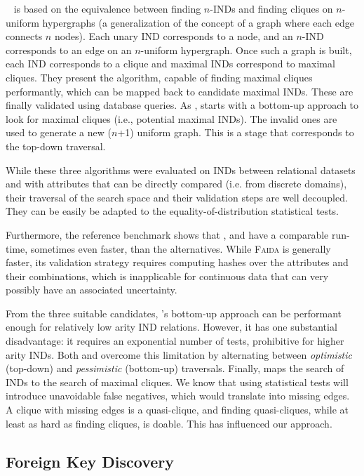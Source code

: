 \Find~\cite{koeller2003discovery} is based on the equivalence
between finding $n$-INDs and finding cliques on $n$-uniform hypergraphs (a generalization
of the concept of a graph where each edge connects $n$ nodes). Each unary IND corresponds
to a node, and an $n$-IND corresponds to an edge on an $n$-uniform hypergraph.
Once such a graph is built, each IND corresponds to a clique and maximal INDs
correspond to maximal cliques. They present the \Hyperclique algorithm,
capable of finding maximal cliques performantly, which can be mapped back to candidate
maximal INDs. These are finally validated using database queries.
As \Zigzag, \Find starts with a bottom-up
approach to look for maximal cliques (i.e., potential maximal INDs). The invalid ones
are used to generate a new ($n$+1) uniform graph. This is a stage that corresponds to the top-down
traversal.

While these three algorithms were evaluated on INDs between relational datasets
and with attributes that can be directly compared (i.e. from discrete domains), their
traversal of the search space and their validation steps are well decoupled. They
can be easily be adapted to the equality-of-distribution statistical tests.

Furthermore, the reference benchmark shows that \Mind, \Find
and \Zigzag have a comparable run-time, sometimes even
faster, than the alternatives.
While \textsc{Faida} is generally faster, its
validation strategy requires computing hashes over the
attributes and their combinations, which is inapplicable
for continuous data that can very possibly have an associated uncertainty.

From the three suitable candidates, \Mind's bottom-up approach can be performant enough for
relatively low arity IND relations. However, it has one substantial disadvantage:
it requires an exponential number of tests, prohibitive for higher arity INDs.
Both \Zigzag and \Find overcome this limitation by alternating between \emph{optimistic}
(top-down) and \emph{pessimistic} (bottom-up) traversals.
Finally, \Find maps the search of INDs to the search of maximal cliques. We know that
using statistical tests will introduce unavoidable false negatives, which would
translate into missing edges.
A clique with missing edges is a quasi-clique, and finding quasi-cliques, while at least
as hard as finding cliques, is doable. This has influenced our approach.

\subsection{Foreign Key Discovery}

